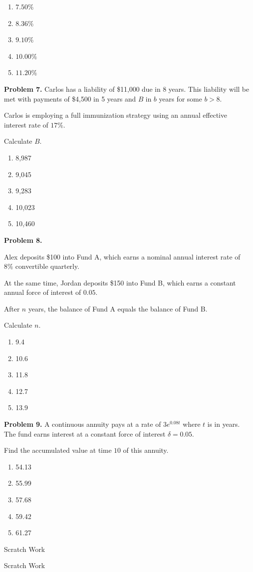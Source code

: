 \documentclass[12pt]{article}
\begin{document}
\begin{enumerate}[label=\Alph*.]
    \item $7.50\%$
    \item $8.36\%$
    \item $9.10\%$
    \item $10.00\%$
    \item $11.20\%$
\end{enumerate}




\newpage


\textbf{Problem 7.}
Carlos has a liability of \$11{,}000 due in 8 years. This liability will be met with payments of \$4{,}500 in 5 years and $B$ in $b$ years for some $b>8$.

Carlos is employing a full immunization strategy using an annual effective interest rate of $17\%$.

Calculate $B$.

\begin{enumerate}[label=\Alph*.]
\item 8,987
\item 9,045
\item 9,283
\item 10,023
\item 10,460
\end{enumerate}


\newpage


\textbf{Problem 8.}

Alex deposits \$100 into Fund A, which earns a nominal annual interest rate of $8\%$ convertible quarterly.

At the same time, Jordan deposits \$150 into Fund B, which earns a constant annual force of interest of $0.05$.

After $n$ years, the balance of Fund A equals the balance of Fund B.

Calculate $n$.

\begin{enumerate}[label=\Alph*.]
\item 9.4
\item 10.6
\item 11.8
\item 12.7
\item 13.9
\end{enumerate}

\newpage


\textbf{Problem 9.}
A continuous annuity pays at a rate of $3e^{0.08t}$ where $t$ is in years. The fund earns interest at a constant force of interest $\delta=0.05$.

Find the accumulated value at time $10$ of this annuity.

\begin{enumerate}[label=\Alph*.]
\item 54.13
\item 55.99
\item 57.68
\item 59.42
\item 61.27
\end{enumerate}


\newpage

Scratch Work

\newpage 

Scratch Work
\end{document}

